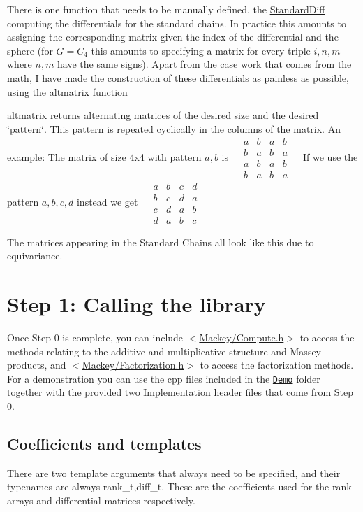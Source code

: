 \begin{DoxyItemize}
\item There is one function that needs to be manually defined, the \hyperlink{classGroupSpecific_1_1Function_a8ead55e2f2e2bbda4deea3964793498d}{Standard\+Diff} computing the differentials for the standard chains. In practice this amounts to assigning the corresponding matrix given the index of the differential and the sphere (for $G=C_4$ this amounts to specifying a matrix for every triple $i,n,m$ where $n,m$ have the same signs). Apart from the case work that comes from the math, I have made the construction of these differentials as painless as possible, using the \hyperlink{namespaceMackey_a26a529f63caac9c5b4dc809e0e5831be}{altmatrix} function
\item \hyperlink{namespaceMackey_a26a529f63caac9c5b4dc809e0e5831be}{altmatrix} returns alternating matrices of the desired size and the desired \char`\"{}pattern\char`\"{}. This pattern is repeated cyclically in the columns of the matrix. An example\+: The matrix of size 4x4 with pattern $a,b$ is ~\newline
 $\begin{matrix} a&b&a&b\\ b&a&b&a\\ a&b&a&b \\ b&a&b&a \end{matrix}$ ~\newline
 If we use the pattern $a,b,c,d$ instead we get ~\newline
 $\begin{matrix} a&b&c&d\\ b&c&d&a\\ c&d&a&b \\ d&a&b&c \end{matrix}$ ~\newline

\item The matrices appearing in the Standard Chains all look like this due to equivariance.
\end{DoxyItemize}\hypertarget{use_next}{}\section{Step 1\+: Calling the library}\label{use_next}
Once Step 0 is complete, you can include {\ttfamily $<$\hyperlink{Compute_8h}{Mackey/\+Compute.\+h}$>$} to access the methods relating to the additive and multiplicative structure and Massey products, and {\ttfamily $<$\hyperlink{Factorization_8h}{Mackey/\+Factorization.\+h}$>$} to access the factorization methods. For a demonstration you can use the cpp files included in the \href{https://github.com/NickG-Math/Mackey/tree/master/Demo}{\tt Demo} folder together with the provided two Implementation header files that come from Step 0.\hypertarget{use_coeff}{}\subsection{Coefficients and templates}\label{use_coeff}
There are two template arguments that always need to be specified, and their typenames are always {\ttfamily rank\+\_\+t,diff\+\_\+t}. These are the coefficients used for the rank arrays and differential matrices respectively.


